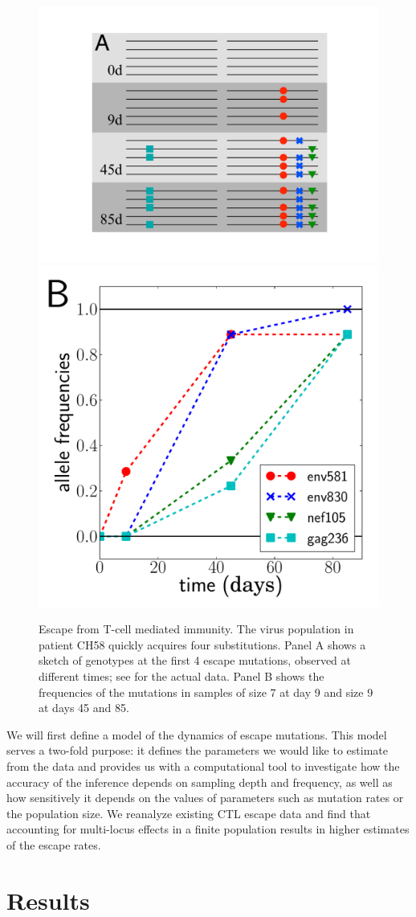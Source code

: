\documentclass{frontiers}
\begin{document}
\begin{figure}[tbp]
\begin{center}
  \includegraphics[width=0.26\columnwidth]{figures_manuscript/CH58_allele_demo}
  \includegraphics[width=0.23\columnwidth]{figures_manuscript/CH58_alleles}
  \caption[labelInTOC]{Escape from T-cell mediated immunity. The virus
  population in patient CH58 quickly acquires four substitutions. Panel A
shows a sketch of genotypes at the first 4 escape mutations, observed
  at different times; see \citep{SalazarGonzalez:2009p35091,Goonetilleke:2009p42296} 
  for the actual
  data. Panel B shows the frequencies of the mutations in samples of size 7 
  at day 9 and size 9 at days 45
  and 85.}
  \label{fig:data_example}
\end{center}
\end{figure}

We will first define a model of the dynamics of escape mutations. This model
serves a two-fold purpose: it defines the parameters we would like to
estimate from the data and provides us with a computational tool to
investigate how the accuracy of the inference depends on sampling depth and
frequency, as well as how sensitively it depends on the values of parameters
such as mutation rates or the population size. We reanalyze existing CTL
escape data and find that accounting for multi-locus effects in a finite population
results in higher estimates of the escape rates.

\section{Results}
\end{document}
